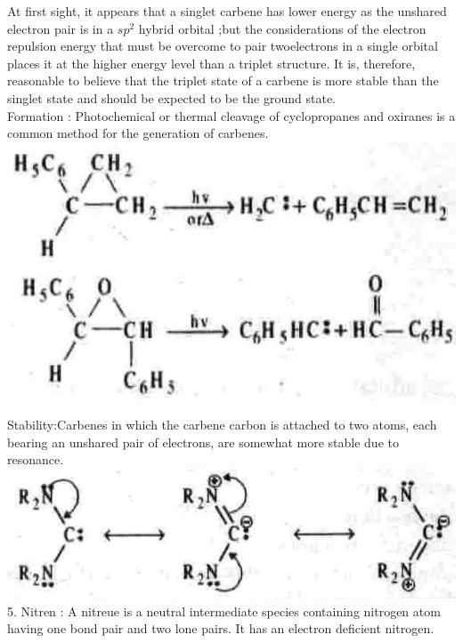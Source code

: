 \documentclass[10pt]{article}
\begin{document}
At first sight, it appears that a singlet carbene has lower energy as the unshared electron pair is in a $s p^{2}$ hybrid orbital ;but the considerations of the electron repulsion energy that must be overcome to pair twoelectrons in a single orbital places it at the higher energy level than a triplet structure. It is, therefore, reasonable to believe that the triplet state of a carbene is more stable than the singlet state and should be expected to be the ground state.\\
Formation : Photochemical or thermal cleavage of cyclopropanes and oxiranes is a common method for the generation of carbenes.\\
\includegraphics[max width=\textwidth, center]{2025_01_28_8470952b98110cec3aabg-089(4)}\\
\includegraphics[max width=\textwidth, center]{2025_01_28_8470952b98110cec3aabg-089}

Stability:Carbenes in which the carbene carbon is attached to two atoms, each bearing an unshared pair of electrons, are somewhat more stable due to resonance.\\
\includegraphics[max width=\textwidth, center]{2025_01_28_8470952b98110cec3aabg-089(2)}\\
5. Nitren : A nitreue is a neutral intermediate species containing nitrogen atom having one bond pair and two lone pairs. It has an electron deficient nitrogen.
\end{document}

